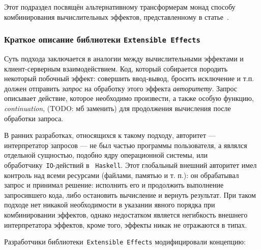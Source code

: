 Этот подраздел посвящён альтернативному трансформерам монад способу комбинирования вычислительных эффектов, представленному в статье~\autocite{ExtEffects}. 

\subsubsection{Краткое описание библиотеки \lstinline{Extensible Effects}}

Суть подхода заключается в аналогии между вычислительными эффектами и клиент-серверным взаимодействием. Код, который собирается породить некоторый побочный эффект: совершить ввод-вывод, бросить исключение и т.п. должен отправить \emph{запрос} на обработку этого эффекта \emph{авторитету}. Запрос описывает действие, которое необходимо произвести, а также особую функцию, \emph{continuation}, (TODO: мб заменить) для продолжения вычисления после обработки запроса. 

В ранних разработках, относящихся к такому подходу, авторитет --- интерпретатор запросов --- не был частью программы пользователя, а являлся отдельной сущностью, подобно ядру операционной системы, или обработчику~\lstinline{IO}-действий в ~\lstinline{Haskell}. Этот глобальный внешний авторитет имел контроль над всеми ресурсами (файлами, памятью и т. п.): он обрабатывал запрос и принимал решение: исполнить его и продолжить выполнение запросившего кода, либо остановить вычисление и вернуть результат. При таком подходе нет никакой необходимости в указании явного порядка при комбинировании эффектов, однако недостатком является негибкость внешнего интерпретатора эффектов, кроме того, эффекты никак не отражаются в типах.

Разработчики библиотеки~\lstinline{Extensible Effects} модифицировали концепцию: 

